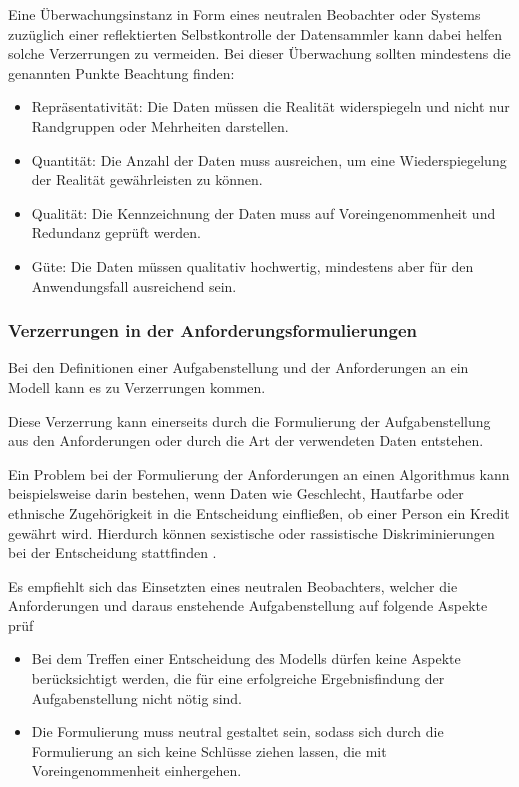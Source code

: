 \documentclass[12pt]{article}
\begin{document}
Eine Überwachungsinstanz in Form eines neutralen Beobachter oder Systems zuzüglich einer reflektierten Selbstkontrolle der Datensammler kann dabei helfen solche Verzerrungen zu vermeiden.
Bei dieser Überwachung sollten mindestens die genannten Punkte Beachtung finden:
\begin{itemize}

    \item Repräsentativität: Die Daten müssen die Realität widerspiegeln und nicht nur Randgruppen oder Mehrheiten darstellen.
    \item Quantität: Die Anzahl der Daten muss ausreichen,  um eine Wiederspiegelung der Realität gewährleisten zu können.
    \item Qualität: Die Kennzeichnung der Daten muss auf Voreingenommenheit und Redundanz geprüft werden.
    \item Güte: Die Daten müssen qualitativ hochwertig, mindestens aber für den Anwendungsfall ausreichend sein.

\end{itemize}

\subsubsection{Verzerrungen in der Anforderungsformulierungen}
Bei den Definitionen einer Aufgabenstellung und der Anforderungen an ein Modell kann es zu Verzerrungen kommen.

Diese Verzerrung kann einerseits durch die Formulierung der Aufgabenstellung aus den Anforderungen oder durch die Art der verwendeten Daten entstehen.  \cite[S. 51f.]{Srinivasan}

Ein Problem bei der Formulierung der Anforderungen an einen Algorithmus kann beispielsweise darin bestehen, wenn Daten wie Geschlecht, Hautfarbe oder ethnische Zugehörigkeit in die Entscheidung einfließen, ob einer Person ein Kredit gewährt wird. Hierdurch können sexistische oder rassistische Diskriminierungen bei der Entscheidung stattfinden \cite[S. 51f.]{Srinivasan}.

Es empfiehlt sich das Einsetzten eines neutralen Beobachters, welcher die Anforderungen und daraus enstehende Aufgabenstellung auf folgende Aspekte prüf
\begin{itemize}
    \item Bei dem Treffen einer Entscheidung des Modells dürfen keine Aspekte berücksichtigt werden, die für eine erfolgreiche Ergebnisfindung der Aufgabenstellung nicht nötig sind.
    \item Die Formulierung muss neutral gestaltet sein, sodass sich durch die Formulierung an sich keine Schlüsse ziehen lassen, die mit Voreingenommenheit einhergehen.
\end{itemize}
\end{document}
